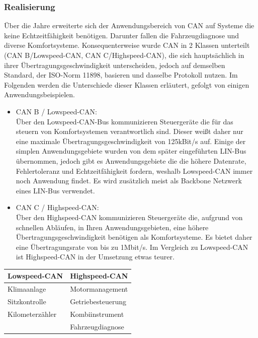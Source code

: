     \subsubsection{Realisierung}
    Über die Jahre erweiterte sich der Anwendungsbereich von CAN auf Systeme
    die keine Echtzeitfähigkeit benötigen. Darunter fallen die Fahrzeugdiagnose und diverse 
    Komfortsysteme. Konsequenterweise wurde CAN in 2 Klassen unterteilt (CAN B/Lowspeed-CAN, 
    CAN C/Highspeed-CAN), die sich hauptsächlich in ihrer Übertragungsgeschwindigkeit 
    unterscheiden, jedoch auf demselben Standard, der ISO-Norm 11898, basieren und dasselbe 
    Protokoll nutzen. Im Folgenden werden die Unterschiede dieser Klassen erläutert, gefolgt von 
    einigen Anwendungsbeispielen.
    \begin{itemize}
        \item{CAN B / Lowspeed-CAN:}\\
        Über den Lowspeed-CAN-Bus kommunizieren Steuergeräte die für das steuern von 
        Komfortsystemen verantwortlich sind. Dieser weißt daher nur eine maximale 
        Übertragungsgeschwindigkeit von 125kBit/s auf. Einige der simplen Anwendungsgebiete wurden
        von dem später eingeführten LIN-Bus übernommen, jedoch gibt es Anwendungsgebiete die 
        die höhere Datenrate, Fehlertoleranz und Echtzeitfähigkeit fordern, weshalb Lowspeed-CAN immer 
        noch Anwendung findet.
        Es wird zusätzlich meist als Backbone Netzwerk eines LIN-Bus verwendet.
        ~\cite{reif2011bosch}
        \item{CAN C / Highspeed-CAN:}\\
        Über den Highspeed-CAN kommunizieren Steuergeräte die, aufgrund von schnellen Abläufen, in 
        Ihren Anwendungsgebieten, eine höhere Übertragungsgeschwindigkeit benötigen als
        Komfortsysteme. Es bietet daher eine Übertragungsrate von bis zu 1Mbit/s.
        Im Vergleich zu Lowspeed-CAN ist Highspeed-CAN in der Umsetzung etwas teurer.
        ~\cite{reif2011bosch}
    \end{itemize}
    \begin{center}
        \begin{tabular}{l|l}
            \textbf{Lowspeed-CAN} & \textbf{Highspeed-CAN}\\

    \hline  Klimaanlage & Motormanagement\\
    \hline  Sitzkontrolle & Getriebesteuerung\\
    \hline  Kilometerzähler & Kombiinstrument\\
    \hline  & Fahrzeugdiagnose\\
    \hline
    \end{tabular}            
    \end{center}
